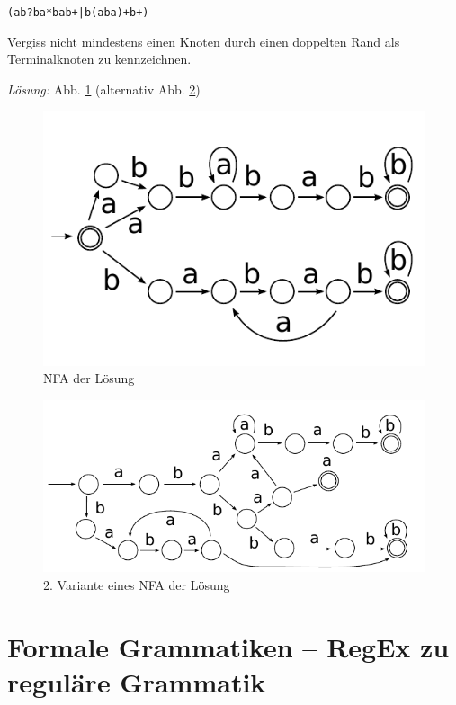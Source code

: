 \documentclass[11pt,a4paper]{article}
\theoremstyle{area}
\begin{document}
\texttt{(ab?ba*bab+|b(aba)+b+)}

Vergiss nicht mindestens einen Knoten durch einen doppelten Rand als
Terminalknoten zu kennzeichnen.

\emph{Lösung:} Abb. \ref{fig:nfa_2} (alternativ Abb. \ref{fig:nfa_3})

\begin{figure}[!ht]
  \begin{center}
    \includegraphics{nfa_2.pdf}
    \caption{NFA der Lösung}
    \label{fig:nfa_2}
  \end{center}
\end{figure}

\begin{figure}[!ht]
  \begin{center}
    \includegraphics{nfa_3.pdf}
    \caption{2. Variante eines NFA der Lösung}
    \label{fig:nfa_3}
  \end{center}
\end{figure}

\section{Formale Grammatiken -- RegEx zu reguläre Grammatik}
\end{document}

